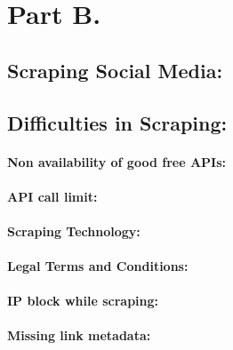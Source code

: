 \section{Part B.}
\subsection*{Scraping Social Media:}

\subsection*{Difficulties in Scraping:}
\paragraph{Non availability of good free APIs:}

\paragraph{API call limit:}


\paragraph{Scraping Technology:}

\paragraph{Legal Terms and Conditions:}

\paragraph{IP block while scraping:}

\paragraph{Missing link metadata: }
